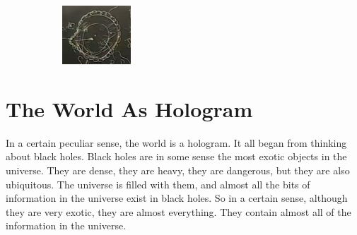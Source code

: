 \documentclass[]{article}
\begin{document}
{\begin{appendices}
\begin{figure}[H]
\begin{center}
\begin{subfigure}[t]{0.45\textwidth}
				\includegraphics[width=\textwidth]{ibh-horizon-inside-large}
			\end{subfigure}
		\end{center}
	\end{figure}

	\section{The World As Hologram}\label{sect:hologram}
	In a certain peculiar sense, the world is a hologram.  It all began from thinking about black holes. Black holes are in some sense the most exotic objects in the universe. They are dense, they are heavy, they are dangerous, but they are also ubiquitous. The universe is filled with them, and almost all the bits of information in the universe exist in black holes. So in a certain sense, although they are very exotic, they are almost everything. They contain almost all of the information in the universe.\cite{susskind2011hologram}
	

\end{appendices}}
\end{document}
